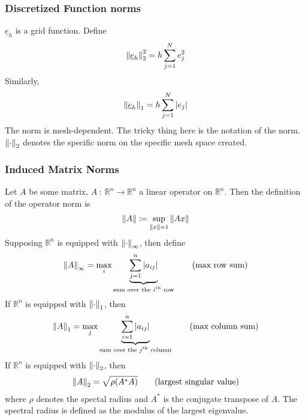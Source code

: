 \documentclass{article}
\newcommand{\Rl}{\mathbb{R}}
\newcommand{\f}[3]{#1\ :\ #2 \rightarrow #3}
\begin{document}
            \subsubsection{Discretized Function norms}
                $\underline{e}_h$ is a grid function.  Define
                \begin{align*}
                    \norm{\underline{e}_h}_2^2 = h\sum_{j=1}^N e_j^2
                \end{align*}
                Similarly,
                \begin{align*}
                    \norm{\underline{e}_h}_1 = h \sum_{j=1}^N\abs{e_j}
                \end{align*}
                The norm is mesh-dependent.  The tricky thing here is the notation of the norm.  $\norm{\cdot}_2$ denotes the specific norm on the specific mesh space created.
            \subsubsection{Induced Matrix Norms}
                Let $A$ be some matrix, $\f{A}{\Rl^n}{\Rl^n}$ a linear operator on $\Rl^n$.  Then the definition of the operator norm is
                \begin{align*}
                    \norm{A} \coloneqq \sup_{\norm{x} = 1} \norm{Ax}
                \end{align*}
                Supposing $\Rl^n$ is equipped with $\norm{\cdot}_\infty$, then define
                \begin{align*}
                    \norm{A}_\infty = \max_i \underbrace{\sum_{j=1}^n \abs{a_{ij}}}_{\text{sum over the $i$\textsuperscript{th} row}} \qquad \text{(max row sum)} \\
                \end{align*}
                If $\Rl^n$ is equipped with $\norm{\cdot}_1$, then
                \begin{align*}
                    \norm{A}_1 = \max_j \underbrace{\sum_{i=1}^n \abs{a_{ij}}}_{\text{sum over the $j$\textsuperscript{th} column}} \qquad \text{(max column sum)} \\
                \end{align*}
                If $\Rl^n$ is equipped with $\norm{\cdot}_2$, then
                \begin{align*}
                    \norm{A}_2 = \sqrt{\rho(A^*A)} \qquad \text{(largest singular value)}
                \end{align*}
                where $\rho$ denotes the spectal radius and $A^*$ is the conjugate transpose of $A$.  The spectral radius is defined as the modulus of the largest eigenvalue.
\end{document}
